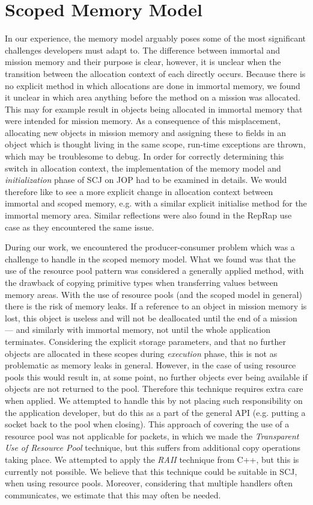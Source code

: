\section{Scoped Memory Model} %
 \label{sec:scoped_memory_model}
In our experience, the memory model arguably poses some of the most significant challenges developers must adapt to. The difference between immortal and mission memory and their purpose is clear, however, it is unclear when the transition between the allocation context of each directly occurs. Because there is no explicit method in which allocations are done in immortal memory, we found it unclear in which area anything before the  method on a mission was allocated. This may for example result in objects being allocated in immortal memory that were intended for mission memory. As a consequence of this misplacement, allocating new objects in mission memory and assigning these to fields in an object which is thought living in the same scope, run-time exceptions are thrown, which may be troublesome to debug. In order for correctly determining this switch in allocation context, the implementation of the memory model and \textit{initialization} phase of SCJ on JOP had to be examined in details. We would therefore like to see a more explicit change in allocation context between immortal and scoped memory, e.g. with a similar explicit initialise method for the immortal memory area. Similar reflections were also found in the RepRap use case\cite{Schoeberl:2012:RepRap} as they encountered the same issue.

During our work, we encountered the producer-consumer problem which was a challenge to handle in the scoped memory model. What we found was that the use of the resource pool pattern was considered a generally applied method, with the drawback of copying primitive types when transferring values between memory areas. With the use of resource pools (and the scoped model in general) there is the risk of memory leaks. If a reference to an object in mission memory is lost, this object is useless and will not be deallocated until the end of a mission --- and similarly with immortal memory, not until the whole application terminates. Considering the explicit storage parameters, and that no further objects are allocated in these scopes during \textit{execution} phase, this is not as problematic as memory leaks in general. However, in the case of using resource pools this would result in, at some point, no further objects ever being available if objects are not returned to the pool. Therefore this technique requires extra care when applied. We attempted to handle this by not placing such responsibility on the application developer, but do this as a part of the general API (e.g. putting a socket back to the pool when closing). This approach of covering the use of a resource pool was not applicable for packets, in which we made the \textit{Transparent Use of Resource Pool} technique, but this suffers from additional copy operations taking place. We attempted to apply the \textit{RAII} technique from C++, but this is currently not possible. We believe that this technique could be suitable in SCJ, when using resource pools. Moreover, considering that multiple handlers often communicates, we estimate that this may often be needed.

